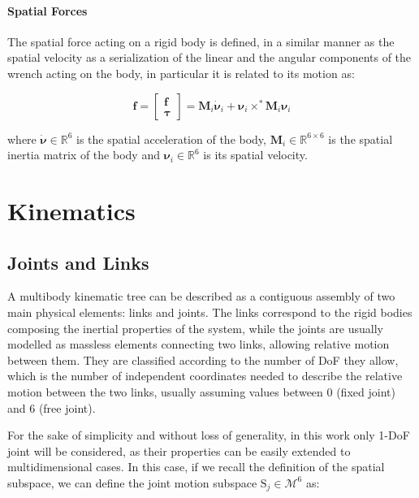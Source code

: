 \paragraph{Spatial Forces} The spatial force acting on a rigid body is defined, in a similar manner as the spatial velocity as a serialization of the linear and the angular components of the wrench acting on the body, in particular it is related to its motion as:

\begin{equation}
    \mathbf{f} = \begin{bmatrix}
        \mathbf{f} \\
        \boldsymbol{\tau}
    \end{bmatrix} = \mathbf{M}_i \dot{\boldsymbol{\nu}} _i + \boldsymbol{\nu}_i \times ^* \mathbf{M}_i \boldsymbol{\nu}_i
\end{equation}

where $\dot{\boldsymbol{\nu}} \in \mathbb{R}^6$ is the spatial acceleration of the body, $\mathbf{M}_i \in \mathbb{R}^{6 \times 6}$ is the spatial inertia matrix of the body and $\boldsymbol{\nu}_i \in \mathbb{R}^6$ is its spatial velocity.

\section{Kinematics}

\subsection{Joints and Links}

A multibody kinematic tree can be described as a contiguous assembly of two main physical elements: links and joints. The links correspond to the rigid bodies composing the inertial properties of the system, while the joints are usually modelled as massless elements connecting two links, allowing relative motion between them. They are classified according to the number of \ac{DoF} they allow, which is the number of independent coordinates needed to describe the relative motion between the two links, usually assuming values between 0 (fixed joint) and 6 (free joint).

For the sake of simplicity and without loss of generality, in this work only 1-\ac{DoF} joint will be considered, as their properties can be easily extended to multidimensional cases. In this case, if we recall the definition of the spatial subspace, we can define the joint motion subspace $\mathrm{S} _j \in \mathcal{M} ^6$ as:

